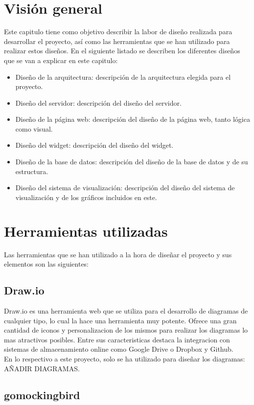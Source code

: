 \section{Visión general}
Este capitulo tiene como objetivo describir la labor de diseño realizada para desarrollar el proyecto, así como las herramientas que se han utilizado para realizar estos diseños. En el siguiente listado se describen los diferentes diseños que se van a explicar en este capitulo:

\begin{itemize}
	\item Diseño de la arquitectura: descripción de la arquitectura elegida para el proyecto.
	\item Diseño del servidor: descripción del diseño del servidor.
	\item Diseño de la página web: descripción del diseño de la página web, tanto lógica como visual.
	\item Diseño del widget: descripción del diseño del widget.
	\item Diseño de la base de datos: descripción del diseño de la base de datos y de su estructura.
	\item Diseño del sistema de visualización: descripción del diseño del sistema de visualización y de los gráficos incluidos en este.
\end{itemize}

\section{Herramientas utilizadas}
Las herramientas que se han utilizado a la hora de diseñar el proyecto y sus elementos son las siguientes:

\subsection{Draw.io}
Draw.io es una herramienta web que se utiliza para el desarrollo de diagramas de cualquier tipo, lo cual la hace una herramienta muy potente. Ofrece una gran cantidad de iconos y personalizacion de los mismos para realizar los diagramas lo mas atractivos posibles. Entre sus caracteristicas destaca la integracion con sistemas de almacenamiento online como Google Drive o Dropbox y Github.\\

En lo respectivo a este proyecto, solo se ha utilizado para diseñar los diagramas: AÑADIR DIAGRAMAS.

\subsection{gomockingbird}


